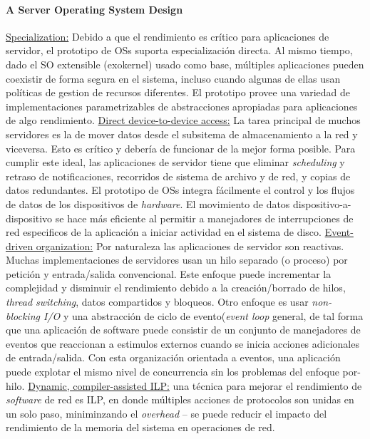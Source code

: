 \paragraph{\textnormal{\textbf{A Server Operating System Design}}}
\underline{Specialization:} Debido a que el rendimiento es crítico para aplicaciones de servidor, el prototipo de OSs suporta especialización directa. Al mismo tiempo, dado el SO extensible (exokernel) usado como base, múltiples aplicaciones pueden coexistir de forma segura en el sistema, incluso cuando algunas de ellas usan políticas de gestion de recursos diferentes. El prototipo provee una variedad de implementaciones parametrizables de abstracciones apropiadas para aplicaciones de algo rendimiento. \underline{Direct device-to-device access:} La tarea principal de muchos servidores es la de mover datos desde el subsitema de almacenamiento a la red y viceversa. Esto es crítico y debería de funcionar de la mejor forma posible. Para cumplir este ideal, las aplicaciones de servidor tiene que eliminar \textit{scheduling} y retraso de notificaciones, recorridos de sistema de archivo y de red, y copias de datos redundantes. El prototipo de OSs integra fácilmente el control y los flujos de datos de los dispositivos de \textit{hardware}. El movimiento de datos dispositivo-a-dispositivo se hace más eficiente al permitir a manejadores de interrupciones de red especificos de la aplicación a iniciar actividad en el sistema de disco. \underline{Event-driven organization:} Por naturaleza las aplicaciones de servidor son reactivas. Muchas implementaciones de servidores usan un hilo separado (o proceso) por petición y entrada/salida convencional. Este enfoque puede incrementar la complejidad y disminuir el rendimiento debido a la creación/borrado de hilos, \textit{thread switching}, datos compartidos y bloqueos. Otro enfoque es usar \textit{non-blocking I/O} y una abstracción de ciclo de evento(\textit{event loop} general, de tal forma que una aplicación de software puede consistir de un conjunto de manejadores de eventos que reaccionan a estimulos externos cuando se inicia acciones adicionales de entrada/salida. Con esta organización orientada a eventos, una aplicación puede explotar el mismo nivel de concurrencia sin los problemas del enfoque por-hilo. \underline{Dynamic, compiler-assisted ILP:} una técnica para mejorar el rendimiento de \textit{software} de red es ILP, en donde múltiples acciones de protocolos son unidas en un solo paso, miniminzando el \textit{overhead} -- se puede reducir el impacto del rendimiento de la memoria del sistema en operaciones de red.

